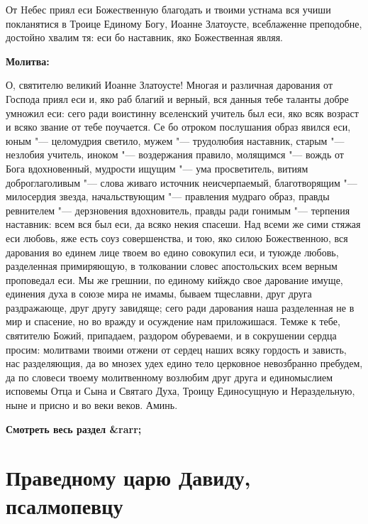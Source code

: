 От Hебес приял еси Божественную благодать и твоими устнама вся учиши покланятися в Троице Единому Богу, Иоанне Златоусте, всеблаженне преподобне, достойно хвалим тя: еси бо наставник, яко Божественная являя.


\medskip


\bfseries Молитва:\normalfont{}


О, святителю великий Иоанне Златоусте! Многая и различная дарования от Господа приял еси и, яко раб благий и верный, вся данныя тебе таланты добре умножил еси: сего ради воистинну вселенский учитель был еси, яко всяк возраст и всяко звание от тебе поучается. Се бо отроком послушания образ явился еси, юным "--- целомудрия светило, мужем "--- трудолюбия наставник, старым "--- незлобия учитель, иноком "--- воздержания правило, молящимся "--- вождь от Бога вдохновенный, мудрости ищущим "--- ума просветитель, витиям доброглаголивым "--- слова живаго источник неисчерпаемый, благотворящим "--- милосердия звезда, начальствующим "--- правления мудраго образ, правды ревнителем "--- дерзновения вдохновитель, правды ради гонимым "--- терпения наставник: всем вся был еси, да всяко некия спасеши. Над всеми же сими стяжая еси любовь, яже есть соуз совершенства, и тою, яко силою Божественною, вся дарования во единем лице твоем во едино совокупил еси, и туюжде любовь, разделенная примиряющую, в толковании словес апостольских всем верным проповедал еси. Мы же грешнии, по единому кийждо свое дарование имуще, единения духа в союзе мира не имамы, бываем тщеславни, друг друга раздражающе, друг другу завидяще; сего ради дарования наша разделенная не в мир и спасение, но во вражду и осуждение нам приложишася. Темже к тебе, святителю Божий, припадаем, раздором обуреваеми, и в сокрушении сердца просим: молитвами твоими отжени от сердец наших всяку гордость и зависть, нас разделяющия, да во мнозех удех едино тело церковное невозбранно пребудем, да по словеси твоему молитвенному возлюбим друг друга и единомыслием исповемы Отца и Сына и Святаго Духа, Троицу Единосущную и Нераздельную, ныне и присно и во веки веков. Аминь.


\mychapterending


\bfseries Смотреть весь раздел &rarr;\normalfont{} 

\section{Праведному царю Давиду, псалмопевцу}
 


